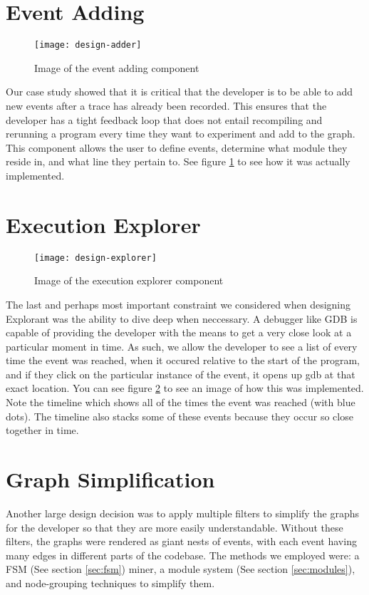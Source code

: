 \section{Event Adding}
\begin{figure}[!ht]
    \centering
    \texttt{[image: design-adder]}
    \caption{Image of the event adding component}
    \label{fig:graph-add}
\end{figure}
Our case study showed that it is critical that the developer is to be able to add new events after a trace has already been recorded. This ensures that the developer has a tight feedback loop that does not entail recompiling and rerunning a program every time they want to experiment and add to the graph. This component allows the user to define events, determine what module they reside in, and what line they pertain to. See figure \ref{fig:graph-add} to see how it was actually implemented. 


\section{Execution Explorer}
\label{sec:exec-explorer}
\begin{figure}[!ht]
    \centering
    \texttt{[image: design-explorer]}
    \caption{Image of the execution explorer component}
    \label{fig:graph-exp}
\end{figure}
The last and perhaps most important constraint we considered when designing Explorant was the ability to dive deep when neccessary. A debugger like GDB is capable of providing the developer with the means to get a very close look at a particular moment in time. As such, we allow the developer to see a list of every time the event was reached, when it occured relative to the start of the program, and if they click on the particular instance of the event, it opens up gdb at that exact location. You can see figure \ref{fig:graph-exp} to see an image of how this was implemented. Note the timeline which shows all of the times the event was reached (with blue dots). The timeline also stacks some of these events because they occur so close together in time. 

\section{Graph Simplification}
\label{sec:simplification}
Another large design decision was to apply multiple filters to simplify the graphs for the developer so that they are more easily understandable. Without these filters, the graphs were rendered as giant nests of events, with each event having many edges in different parts of the codebase. The methods we employed were: a FSM (See section \ref{sec:fsm}) miner, a module system (See section \ref{sec:modules}), and node-grouping techniques to simplify them.

